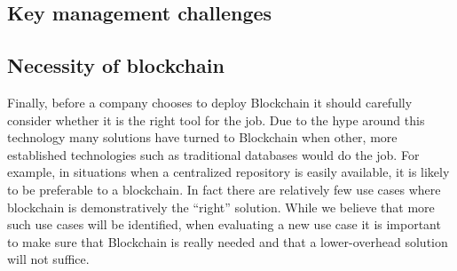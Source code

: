  

\subsection{Key management challenges}

\subsection{Necessity of blockchain}
Finally, before a company chooses to deploy Blockchain it should carefully consider whether it is the right tool for the job.  Due to the hype around this technology many solutions have turned to Blockchain when other, more established technologies such as traditional databases would do the job. For example, in situations when a centralized repository is easily available, it is likely to be preferable to a blockchain.  In fact there are relatively few use cases where blockchain is demonstratively the ``right'' solution.  While we believe that more such use cases will be identified, when evaluating a new use case it is important to make sure that Blockchain is really needed and that a lower-overhead solution will not suffice.


